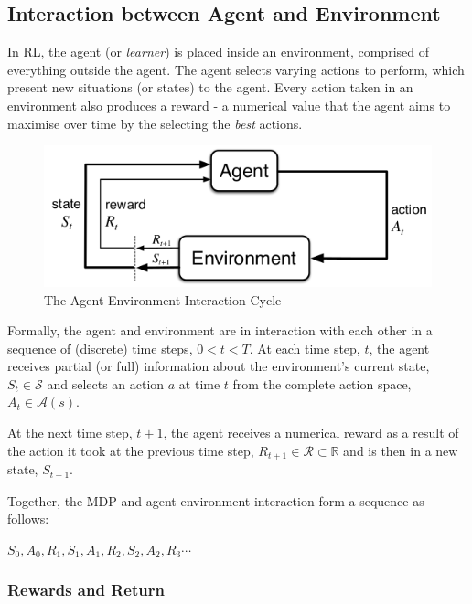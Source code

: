 \documentclass{article}
\begin{document}
\subsection{Interaction between Agent and Environment}

In RL, the agent (or \textit{learner}) is placed inside an environment, comprised of everything outside the agent. The agent selects varying actions to perform, which present new situations (or states) to the agent. Every action taken in an environment also produces a reward - a numerical value that the agent aims to maximise over time by the selecting the \textit{best} actions\cite{Sutton1998}. 

\begin{figure}
    \includegraphics[scale=0.6]{images/Agent_Env_Interaction.png}
    \caption{The Agent-Environment Interaction Cycle}
    \label{fig:ag_env_interaction}
\end{figure}


Formally, the agent and environment are in interaction with each other in a sequence of (discrete) time steps, $ 0 < t < T$. At each time step, $t$, the agent receives partial (or full) information about the environment's current state, $ S_t \in \mathcal{S}$ and selects an action $a$ at time $t$ from the complete action space, $A_t \in \mathcal{A}(s)$. 

At the next time step, $t+1$, the agent receives a numerical reward as a result of the action it took at the previous time step, $R_{t+1} \in \mathcal{R} \subset \mathbb{R}$ and is then in a new state, $S_{t+1}$. 

Together, the MDP and agent-environment interaction form a sequence as follows: 

$S_0, A_0, R_1, S_1, A_1, R_2, S_2, A_2, R_3 \cdots $


\subsubsection{Rewards and Return}
\end{document}
